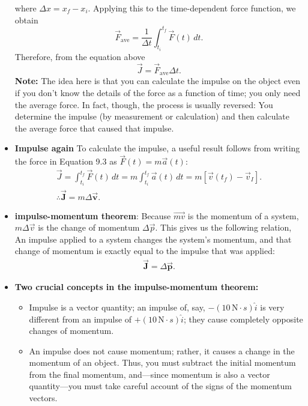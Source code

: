 \documentclass{report}
\begin{document}
\begin{itemize}
\[            \]
            where $\Delta x = x_f - x_i$. Applying this to the time-dependent force function, we obtain
            \[
                \vec{F}_{\text{ave}} = \frac{1}{\Delta t} \int_{t_i}^{t_f} \vec{F}(t) \, dt.
            \]
            Therefore, from the equation above
            \[
                \vec{J} = \vec{F}_{\text{ave}} \Delta t.
            \]
            \bigbreak \noindent 
            \textbf{Note:} The idea here is that you can calculate the impulse on the object even if you don’t know the details of the force as a function of time; you only need the average force. In fact, though, the process is usually reversed: You determine the impulse (by measurement or calculation) and then calculate the average force that caused that impulse.
        \item \textbf{Impulse again}
            To calculate the impulse, a useful result follows from writing the force in Equation 9.3 as $\vec{F}(t) = m\vec{a}(t)$:
            \begin{align*}
                \vec{J} = \int_{t_i}^{t_f} \vec{F}(t) \, dt = m\int_{t_i}^{t_f} \vec{a}(t) \, dt = m[\vec{v}(t_f) - \vec{v}_I]. \\
                \therefore \vec{\mathbf{J}} = m\Delta\vec{\mathbf{v}}
            .\end{align*}
        \item \textbf{impulse-momentum theorem}:
            Because $\vec{mv}$ is the momentum of a system, $m\Delta\vec{v}$ is the change of momentum $\Delta\vec{p}$. This gives us the following relation,
            \bigbreak \noindent 
            An impulse applied to a system changes the system’s momentum, and that change of momentum is exactly equal to the impulse that was applied:
            \begin{align*}
                \vec{\mathbf{J}} = \Delta \vec{\mathbf{p}}
            .\end{align*}
        \item \textbf{Two crucial concepts in the impulse-momentum theorem:}
            \begin{itemize}
                \item Impulse is a vector quantity; an impulse of, say, $-(10\, \text{N} \cdot s) \hat{i}$ is very different from an impulse of $+(10\, \text{N} \cdot s) \hat{i}$; they cause completely opposite changes of momentum.
                \item An impulse does not cause momentum; rather, it causes a change in the momentum of an object. Thus, you must subtract the initial momentum from the final momentum, and---since momentum is also a vector quantity---you must take careful account of the signs of the momentum vectors.

\end{itemize}
\end{itemize}
\end{document}
